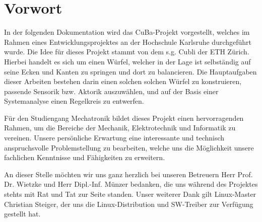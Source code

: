 \section*{Vorwort}
In der folgenden Dokumentation wird das \ac{CuBa}-Projekt vorgestellt, welches im Rahmen eines Entwicklungsprojektes an der Hochschule Karlsruhe durchgeführt wurde. Die Idee für dieses Projekt stammt von dem s.g. Cubli der ETH Zürich. Hierbei handelt es sich um einen Würfel, welcher in der Lage ist selbständig auf seine Ecken und Kanten zu springen und dort zu balancieren. Die Hauptaufgaben dieser Arbeiten bestehen darin einen solchen solchen Würfel zu konstruieren, passende Sensorik bzw. Aktorik auszuwählen, und auf der Basis einer Systemanalyse einen Regelkreis zu entwerfen. 
\newline

Für den Studiengang Mechatronik bildet dieses Projekt einen hervorragenden Rahmen, um die Bereiche der Mechanik, Elektrotechnik und Informatik zu vereinen. Unsere persönliche Erwartung eine interessante und technisch anspruchsvolle Problemstellung zu bearbeiten, welche uns die Möglichkeit unsere fachlichen Kenntnisse und Fähigkeiten zu erweitern.
\newline

An dieser Stelle möchten wir uns ganz herzlich bei unseren Betreuern Herr Prof. Dr. Wietzke und Herr Dipl.-Inf. Münzer bedanken, die uns während des Projektes stehts mit Rat und Tat zur Seite standen. Unser weiterer Dank gilt Linux-Master Christian Steiger, der uns die Linux-Distribution und SW-Treiber zur Verfügung gestellt hat.